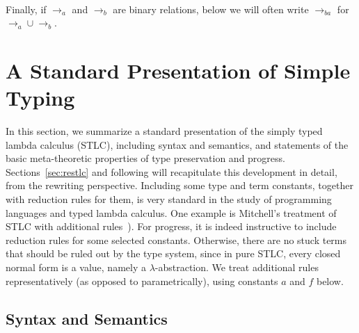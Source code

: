 \documentclass{LMCS}
\begin{document}
\ 

\noindent Finally, if $\to_a$ and $\to_b$ are binary relations, below
we will often write $\to_{ba}$ for $\to_a \cup \to_b$.

\section{A Standard Presentation of Simple Typing}
\label{sec:std-presentation}

In this section, we summarize a standard presentation of the simply
typed lambda calculus (STLC), including syntax and semantics, and statements
of the basic meta-theoretic properties of type preservation and
progress.  Sections~\ref{sec:restlc} and following will recapitulate
this development in detail, from the rewriting perspective.  Including
some type and term constants, together with reduction rules for them,
is very standard in the study of programming languages and typed
lambda calculus.  One example is Mitchell's treatment of STLC with
additional rules~\cite[Section 4.4.3]{M96}).  For progress, it is
indeed instructive to include reduction rules for some selected
constants.  Otherwise, there are no stuck terms that should be ruled
out by the type system, since in pure STLC, every closed normal form
is a value, namely a $\lambda$-abstraction.  We treat additional rules
representatively (as opposed to parametrically), using constants $a$
and $f$ below.

\subsection{Syntax and Semantics}
\label{sec:stlcstand}
\end{document}
